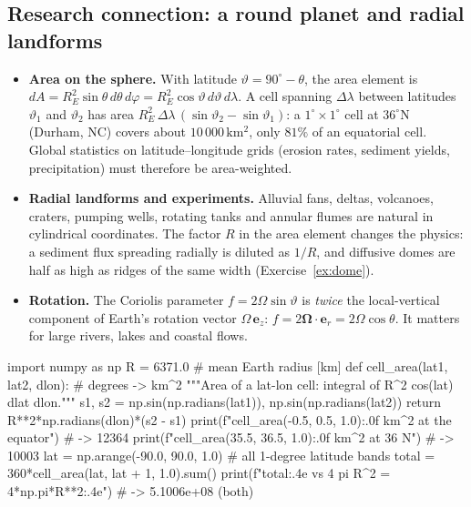 \documentclass[11pt,letterpaper]{article}
\numberwithin{equation}{section}
\newcommand{\e}[1]{\mathbf{e}_{#1}}
\newcommand{\units}[1]{\,\mathrm{#1}}
\begin{document}
\subsection{Research connection: a round planet and radial landforms}
\begin{research}
\begin{itemize}[leftmargin=1.2em]
  \item \textbf{Area on the sphere.} With latitude $\vartheta=90^\circ-\theta$, the area element is
        $dA=R_E^2\sin\theta\,d\theta\,d\varphi=R_E^2\cos\vartheta\,d\vartheta\,d\lambda$. A cell spanning $\Delta\lambda$ between
        latitudes $\vartheta_1$ and $\vartheta_2$ has area $R_E^2\,\Delta\lambda\,(\sin\vartheta_2-\sin\vartheta_1)$: a $1^\circ\times1^\circ$
        cell at $36^\circ$N (Durham, NC) covers about $10\,000\units{km^2}$, only $81\%$ of an equatorial cell. Global statistics on
        latitude--longitude grids (erosion rates, sediment yields, precipitation) must therefore be area-weighted.
  \item \textbf{Radial landforms and experiments.} Alluvial fans, deltas, volcanoes, craters, pumping wells, rotating tanks and
        annular flumes are natural in cylindrical coordinates. The factor $R$ in the area element changes the physics: a sediment
        flux spreading radially is diluted as $1/R$, and diffusive domes are half as high as ridges of the same width
        (Exercise~\ref{ex:dome}).
  \item \textbf{Rotation.} The Coriolis parameter $f=2\Omega\sin\vartheta$ is \emph{twice} the local-vertical component of Earth's rotation
        vector $\Omega\,\e{z}$: $f=2\bm\Omega\cdot\e{r}=2\Omega\cos\theta$. It matters for large rivers, lakes and coastal flows.
\end{itemize}
\end{research}

\begin{pycode}
import numpy as np
R = 6371.0                               # mean Earth radius [km]
def cell_area(lat1, lat2, dlon):         # degrees -> km^2
    """Area of a lat-lon cell: integral of R^2 cos(lat) dlat dlon."""
    s1, s2 = np.sin(np.radians(lat1)), np.sin(np.radians(lat2))
    return R**2*np.radians(dlon)*(s2 - s1)
print(f"{cell_area(-0.5, 0.5, 1.0):.0f} km^2 at the equator")  # -> 12364
print(f"{cell_area(35.5, 36.5, 1.0):.0f} km^2 at 36 N")        # -> 10003
lat = np.arange(-90.0, 90.0, 1.0)        # all 1-degree latitude bands
total = 360*cell_area(lat, lat + 1, 1.0).sum()
print(f"{total:.4e} vs 4 pi R^2 = {4*np.pi*R**2:.4e}")  # -> 5.1006e+08 (both)
\end{pycode}
\end{document}
